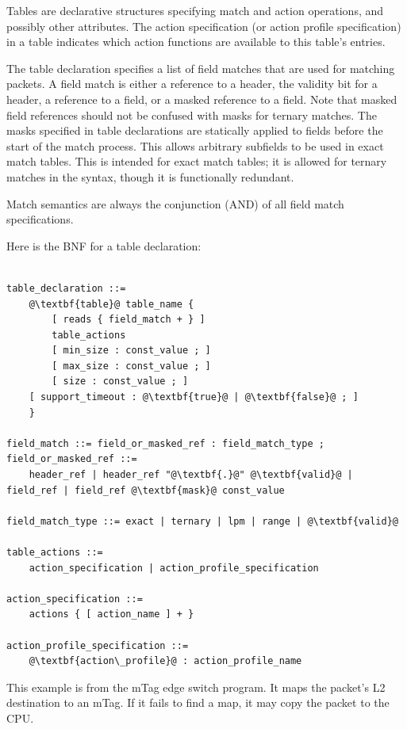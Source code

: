 \documentclass[12pt]{article}
\begin{document}

Tables are declarative structures specifying match and action operations, and
possibly other attributes. The action specification (or action profile
specification) in a table indicates which action functions are available to this
table's entries.

The table declaration specifies a list of field matches that are used
for matching packets. A field match is either a reference to a header,
the validity bit for a header, a reference to a field, or a masked
reference to a field. Note that masked field references should not be
confused with masks for ternary matches. The masks specified in table
declarations are statically applied to fields before the start of the
match process. This allows arbitrary subfields to be used in exact
match tables. This is intended for exact match tables; it is allowed
for ternary matches in the syntax, though it is functionally
redundant.

Match semantics are always the conjunction (AND) of all field match
specifications.

Here is the BNF for a table declaration:

\begin{lstlisting}[frame=single,backgroundcolor=\color{bnfgreen},escapechar=\@]

table_declaration ::=
    @\textbf{table}@ table_name {
        [ reads { field_match + } ]
        table_actions
        [ min_size : const_value ; ]
        [ max_size : const_value ; ]
        [ size : const_value ; ]
	[ support_timeout : @\textbf{true}@ | @\textbf{false}@ ; ]
    }

field_match ::= field_or_masked_ref : field_match_type ;
field_or_masked_ref ::=
    header_ref | header_ref "@\textbf{.}@" @\textbf{valid}@ | field_ref | field_ref @\textbf{mask}@ const_value

field_match_type ::= exact | ternary | lpm | range | @\textbf{valid}@

table_actions ::=
    action_specification | action_profile_specification

action_specification ::=
    actions { [ action_name ] + }

action_profile_specification ::=
    @\textbf{action\_profile}@ : action_profile_name

\end{lstlisting}

This example is from the mTag edge switch program.  It maps the packet's
L2 destination to an mTag. If it fails to find a map, it may copy the packet
to the CPU.
\end{document}
